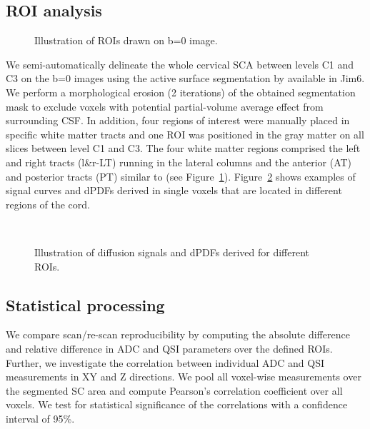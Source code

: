 \subsection{ROI analysis} 
\begin{figure}[htb]
      \centering
      \caption{Illustration of ROIs drawn on b=0 image.}
      \label{fig:chapter5 exp1 ROIs}
\end{figure}
We semi-automatically delineate the whole cervical {\gls{SCA}} between levels C1 and C3 on the b=0 images using the active surface segmentation by \citet{Horsfield:2010} available in Jim6. We perform a morphological erosion (2 iterations) of the obtained segmentation mask to exclude voxels with potential partial-volume average effect from surrounding \gls{CSF}. In addition, four regions of interest were manually placed in specific white matter tracts and one ROI was positioned in the gray matter on all slices between level C1 and C3. The four white matter regions comprised the left and right tracts (l\&r-LT) running in the lateral columns and the anterior (AT) and posterior tracts (PT) similar to \citet{Hesseltine:2006,Freund:2010} (see Figure~\ref{fig:chapter5 exp1 ROIs}). Figure~\ref{fig:chapter5 exp1 PDFs} shows examples of signal curves and \glspl{dPDF} derived in single voxels that are located in different regions of the cord. 
\begin{figure}[tbhp]
      \centering
		\\
      \caption{Illustration of diffusion signals and dPDFs derived for different ROIs.}
      \label{fig:chapter5 exp1 PDFs}
  \end{figure}
\subsection{Statistical processing} We compare scan/re-scan reproducibility by computing the absolute difference and relative difference in ADC and \gls{QSI} parameters over the defined \glspl{ROI}.
%
%
Further, we investigate the correlation between individual \gls{ADC} and \gls{QSI} measurements in XY and Z directions. We pool all voxel-wise measurements over the segmented \gls{SC} area and compute Pearson's correlation coefficient over all voxels. We test for statistical significance of the correlations with a confidence interval of 95\%.


